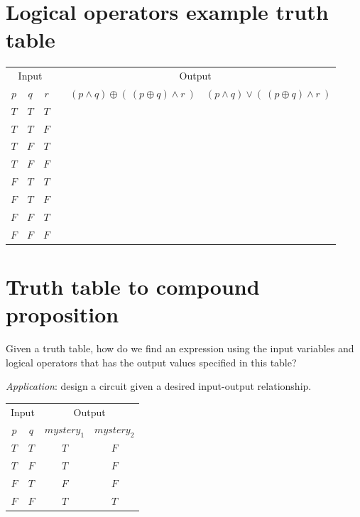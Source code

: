 \documentclass[12pt, oneside]{article}
\begin{document}
\section*{Logical operators example truth table}


\begin{center}
    \begin{tabular}{ccc||p{3in}|c|c}
    \multicolumn{3}{c||}{Input}  & \multicolumn{3}{c}{Output} \\
    $p$ & $q$ & $r$  &  &  $(p \land q) \oplus (~ ( p \oplus q) \land r~)$ & $(p \land q) \vee (~ ( p \oplus q) \land r~)$ \\
    \hline
    $T$ & $T$  & $T$ &   && \\
    $T$ & $T$  & $F$ &   && \\
    $T$ & $F$  & $T$ &   && \\
    $T$ & $F$  & $F$ &   && \\
    $F$ & $T$  & $T$ &   && \\
    $F$ & $T$  & $F$ &   && \\
    $F$ & $F$  & $T$ &   && \\
    $F$ & $F$  & $F$ &   && \\
    \end{tabular}
\end{center}
    \vfill \vfill
\section*{Truth table to compound proposition}


Given a truth table, how do we find an expression
using the input variables and logical operators that has the 
output values specified in this table?

{\it Application}: design a circuit given a desired input-output relationship.

\begin{center}
\begin{tabular}{cc||cc}
\multicolumn{2}{c||}{Input}  &\multicolumn{2}{c}{Output}\\
$p$ & $q$& $mystery_1$ & $mystery_2$\\
\hline
$T$ & $T$  & $T$ & $F$\\
$T$ & $F$  & $T$ & $F$\\
$F$ & $T$  & $F$ & $F$\\
$F$ & $F$  & $T$ & $T$\\
\end{tabular}
\end{center}
\end{document}
